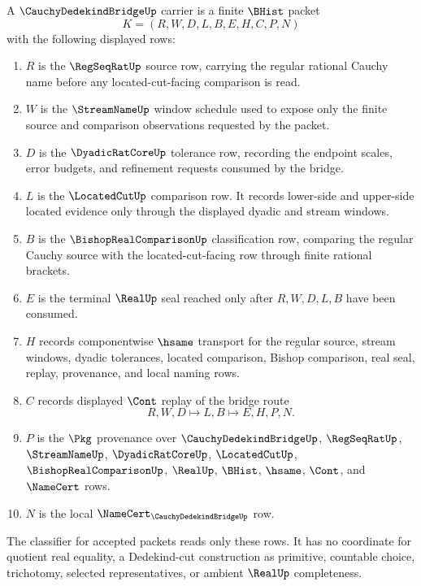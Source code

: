 \begin{definition}\label{def:cauchy-dedekind-bridge-carrier}
A $\CauchyDedekindBridgeUp$ carrier is a finite $\BHist$ packet
$$
K=(R,W,D,L,B,E,H,C,P,N)
$$
with the following displayed rows:
\begin{enumerate}
\item $R$ is the $\RegSeqRatUp$ source row, carrying the regular rational Cauchy name before any located-cut-facing comparison is read.
\item $W$ is the $\StreamNameUp$ window schedule used to expose only the finite source and comparison observations requested by the packet.
\item $D$ is the $\DyadicRatCoreUp$ tolerance row, recording the endpoint scales, error budgets, and refinement requests consumed by the bridge.
\item $L$ is the $\LocatedCutUp$ comparison row. It records lower-side and upper-side located evidence only through the displayed dyadic and stream windows.
\item $B$ is the $\BishopRealComparisonUp$ classification row, comparing the regular Cauchy source with the located-cut-facing row through finite rational brackets.
\item $E$ is the terminal $\RealUp$ seal reached only after $R,W,D,L,B$ have been consumed.
\item $H$ records componentwise $\hsame$ transport for the regular source, stream windows, dyadic tolerances, located comparison, Bishop comparison, real seal, replay, provenance, and local naming rows.
\item $C$ records displayed $\Cont$ replay of the bridge route
$$
R,W,D \longmapsto L,B \longmapsto E,H,P,N .
$$
\item $P$ is the $\Pkg$ provenance over $\CauchyDedekindBridgeUp$, $\RegSeqRatUp$, $\StreamNameUp$, $\DyadicRatCoreUp$, $\LocatedCutUp$, $\BishopRealComparisonUp$, $\RealUp$, $\BHist$, $\hsame$, $\Cont$, and $\NameCert$ rows.
\item $N$ is the local $\NameCert_{\CauchyDedekindBridgeUp}$ row.
\end{enumerate}
The classifier for accepted packets reads only these rows. It has no coordinate for quotient real equality, a Dedekind-cut construction as primitive, countable choice, trichotomy, selected representatives, or ambient $\RealUp$ completeness.
\end{definition}

